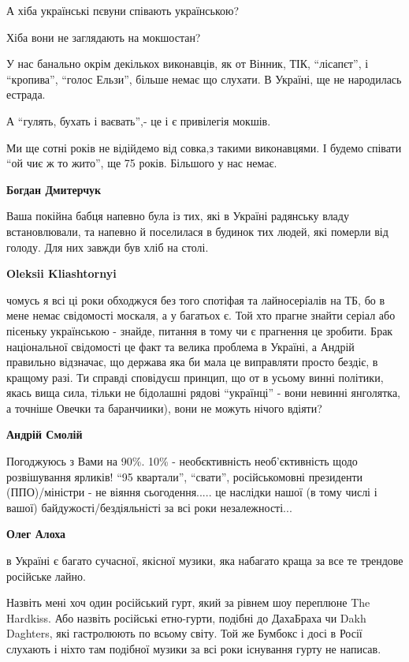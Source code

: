 \begin{itemize}
\begin{itemize}

А хіба українські пєвуни співають українською?

Хіба вони не заглядають на мокшостан?

У нас банально окрім декількох виконавців, як от Вінник, ТІК, \enquote{лісапєт}, і
\enquote{кропива}, \enquote{голос Ельзи}, більше немає що слухати. В Україні, ще не народилась
естрада.

А \enquote{гулять, бухать і ваєвать},- це і є привілегія мокшів.

Ми ще сотні років не відійдемо від совка,з такими виконавцями. І будемо співати
\enquote{ой чиє ж то жито}, ще 75 років. Більшого у нас немає.

\textbf{Богдан Дмитерчук} 

Ваша покійна бабця напевно була із тих, які в Україні радянську владу
встановлювали, та напевно й поселилася в будинок тих людей, які померли від
голоду. Для них завжди був хліб на столі.

\textbf{Oleksii Kliashtornyi} 

чомусь я всі ці роки обходжуся без того спотіфая та лайносеріалів на ТБ, бо в
мене немає свідомості москаля, а у багатьох є. Той хто прагне знайти серіал або
пісеньку українською - знайде, питання в тому чи є прагнення це зробити. Брак
національної свідомості це факт та велика проблема в Україні, а Андрій
правильно відзначає, що держава яка би мала це виправляти просто бездіє, в
кращому разі. Ти справді сповідуєш принцип, що от в усьому винні політики,
якась вища сила, тільки не бідолашні рядові \enquote{українці} - вони невинні
янголятка, а точніше Овечки та баранчиики), вони не можуть нічого вдіяти?


\textbf{Андрій Смолій} 

Погоджуюсь з Вами на 90\%. 10\% - необєктивність необ'єктивність щодо
розвішування ярликів! \enquote{95 квартали}, \enquote{свати}, російськомовні президенти
(ППО)/міністри - не віяння сьогодення..... це наслідки нашої (в тому числі і
вашої) байдужості/бездіяльністі за всі роки незалежності...

\textbf{Олег Алоха} 

в Україні є багато сучасної, якісної музики, яка набагато краща за все те
трендове російське лайно.

Назвіть мені хоч один російський гурт, який за рівнем шоу переплюне The
Hardkiss. Або назвіть російські етно-гурти, подібні до ДахаБраха чи Dakh
Daghters, які гастролюють по всьому світу. Той же Бумбокс і досі в Росії
слухають і ніхто там подібної музики за всі роки існування гурту не написав.


\end{itemize}
\end{itemize}
